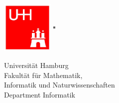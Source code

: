 \begin{titlepage}


\begin{figure}[htbp]
		\begin{minipage}[b]{25mm}
			\includegraphics[width=25mm,clip]{images/logo_uhh}
		\end{minipage}
		\begin{minipage}[b]{2mm}
			\includegraphics[width=1mm,height=25mm]{images/greypixel}
		\end{minipage}
		\begin{minipage}[b]{12.5cm}
			{   
				\vspace{2mm}
				{\Large Universität Hamburg } \\
				Fakultät für Mathematik,\\
				Informatik und Naturwissenschaften \\
				Department Informatik \\
			}
		\end{minipage}
	\end{figure}



\end{titlepage}
